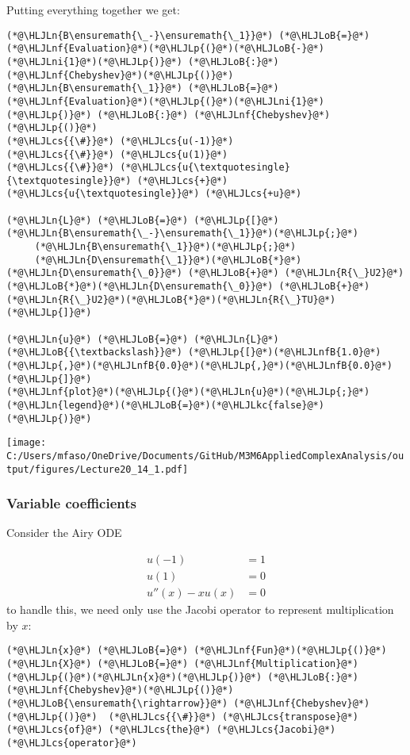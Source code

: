 \documentclass[12pt,a4paper]{article}
\newcommand{\HLJLkc}[1]{\textcolor[RGB]{59,151,46}{\textit{#1}}}
\newcommand{\HLJLn}[1]{#1}
\newcommand{\HLJLnf}[1]{\textcolor[RGB]{66,102,213}{#1}}
\newcommand{\HLJLnfB}[1]{\textcolor[RGB]{59,151,46}{#1}}
\newcommand{\HLJLni}[1]{\textcolor[RGB]{59,151,46}{#1}}
\newcommand{\HLJLoB}[1]{\textcolor[RGB]{102,102,102}{\textbf{#1}}}
\newcommand{\HLJLp}[1]{#1}
\newcommand{\HLJLcs}[1]{\textcolor[RGB]{153,153,119}{\textit{#1}}}
\begin{document}
Putting everything together we get:


\begin{lstlisting}
(*@\HLJLn{B\ensuremath{\_-}\ensuremath{\_1}}@*) (*@\HLJLoB{=}@*) (*@\HLJLnf{Evaluation}@*)(*@\HLJLp{(}@*)(*@\HLJLoB{-}@*)(*@\HLJLni{1}@*)(*@\HLJLp{)}@*) (*@\HLJLoB{:}@*) (*@\HLJLnf{Chebyshev}@*)(*@\HLJLp{()}@*)
(*@\HLJLn{B\ensuremath{\_1}}@*) (*@\HLJLoB{=}@*) (*@\HLJLnf{Evaluation}@*)(*@\HLJLp{(}@*)(*@\HLJLni{1}@*)(*@\HLJLp{)}@*) (*@\HLJLoB{:}@*) (*@\HLJLnf{Chebyshev}@*)(*@\HLJLp{()}@*)
(*@\HLJLcs{{\#}}@*) (*@\HLJLcs{u(-1)}@*)
(*@\HLJLcs{{\#}}@*) (*@\HLJLcs{u(1)}@*)
(*@\HLJLcs{{\#}}@*) (*@\HLJLcs{u{\textquotesingle}{\textquotesingle}}@*) (*@\HLJLcs{+}@*) (*@\HLJLcs{u{\textquotesingle}}@*) (*@\HLJLcs{+u}@*)

(*@\HLJLn{L}@*) (*@\HLJLoB{=}@*) (*@\HLJLp{[}@*)(*@\HLJLn{B\ensuremath{\_-}\ensuremath{\_1}}@*)(*@\HLJLp{;}@*)
     (*@\HLJLn{B\ensuremath{\_1}}@*)(*@\HLJLp{;}@*)
     (*@\HLJLn{D\ensuremath{\_1}}@*)(*@\HLJLoB{*}@*)(*@\HLJLn{D\ensuremath{\_0}}@*) (*@\HLJLoB{+}@*) (*@\HLJLn{R{\_}U2}@*)(*@\HLJLoB{*}@*)(*@\HLJLn{D\ensuremath{\_0}}@*) (*@\HLJLoB{+}@*) (*@\HLJLn{R{\_}U2}@*)(*@\HLJLoB{*}@*)(*@\HLJLn{R{\_}TU}@*)(*@\HLJLp{]}@*)

(*@\HLJLn{u}@*) (*@\HLJLoB{=}@*) (*@\HLJLn{L}@*) (*@\HLJLoB{{\textbackslash}}@*) (*@\HLJLp{[}@*)(*@\HLJLnfB{1.0}@*)(*@\HLJLp{,}@*)(*@\HLJLnfB{0.0}@*)(*@\HLJLp{,}@*)(*@\HLJLnfB{0.0}@*)(*@\HLJLp{]}@*)
(*@\HLJLnf{plot}@*)(*@\HLJLp{(}@*)(*@\HLJLn{u}@*)(*@\HLJLp{;}@*)(*@\HLJLn{legend}@*)(*@\HLJLoB{=}@*)(*@\HLJLkc{false}@*)(*@\HLJLp{)}@*)
\end{lstlisting}

\texttt{[image: C:/Users/mfaso/OneDrive/Documents/GitHub/M3M6AppliedComplexAnalysis/output/figures/Lecture20\_14\_1.pdf]}

\subsubsection{Variable coefficients}
Consider the Airy ODE


\begin{align*}
u(-1) &= 1\\
u(1) &= 0\\
u''(x) - xu(x) &= 0
\end{align*}
to handle this, we need only use the Jacobi operator to represent multiplication by $x$:


\begin{lstlisting}
(*@\HLJLn{x}@*) (*@\HLJLoB{=}@*) (*@\HLJLnf{Fun}@*)(*@\HLJLp{()}@*)
(*@\HLJLn{X}@*) (*@\HLJLoB{=}@*) (*@\HLJLnf{Multiplication}@*)(*@\HLJLp{(}@*)(*@\HLJLn{x}@*)(*@\HLJLp{)}@*) (*@\HLJLoB{:}@*) (*@\HLJLnf{Chebyshev}@*)(*@\HLJLp{()}@*) (*@\HLJLoB{\ensuremath{\rightarrow}}@*) (*@\HLJLnf{Chebyshev}@*)(*@\HLJLp{()}@*)  (*@\HLJLcs{{\#}}@*) (*@\HLJLcs{transpose}@*) (*@\HLJLcs{of}@*) (*@\HLJLcs{the}@*) (*@\HLJLcs{Jacobi}@*) (*@\HLJLcs{operator}@*)
\end{lstlisting}
\end{document}

